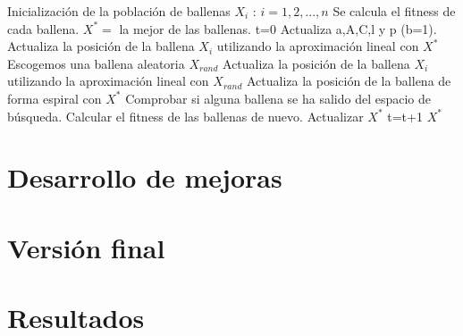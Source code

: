 \documentclass[12pt,a4paper]{article}
\begin{document}
		\begin{algorithm}
			\begin{algorithmic}
				\STATE Inicialización de la población de ballenas $X_i$ : $i=1,2,...,n$
				\STATE Se calcula el fitness de cada ballena.
				\STATE $X^*=$ la mejor de las ballenas.
				\STATE t=0
						\STATE Actualiza a,A,C,l y p (b=1).
								\STATE Actualiza la posición de la ballena $X_i$ utilizando la aproximación lineal con $X^*$
							\ELSE
								\STATE Escogemos una ballena aleatoria $X_{rand}$
								\STATE Actualiza la posición de la ballena $X_i$ utilizando la aproximación lineal con $X_{rand}$
							\ENDIF
						\ELSE
							\STATE Actualiza la posición de la ballena de forma espiral con $X^*$
						\ENDIF
					\ENDFOR
					\STATE Comprobar si alguna ballena se ha salido del espacio de búsqueda.
					\STATE Calcular el fitness de las ballenas de nuevo.
					\STATE Actualizar $X^*$
					\STATE t=t+1
				\ENDWHILE
				\RETURN $X^*$
			\end{algorithmic}
		\end{algorithm}
	
	\section{Desarrollo de mejoras}
	\label{sec:desarrolloMejoras}
	
	\section{Versión final}
	\label{sec:versionFinal}
	
	\section{Resultados}
	\label{sec:resultados}
	
	
	
	
	\newpage
	
\end{document}
